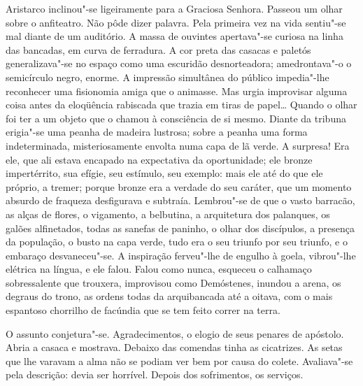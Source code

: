Aristarco inclinou"-se ligeiramente para a Graciosa Senhora.
Passeou um olhar sobre o anfiteatro. Não pôde dizer palavra. Pela
primeira vez na vida sentiu"-se mal diante de um auditório. A massa de
ouvintes apertava"-se curiosa na linha das bancadas, em curva de
ferradura. A cor preta das casacas e paletós generalizava"-se no
espaço como uma escuridão desnorteadora; amedrontava"-o o semicírculo
negro, enorme. A impressão simultânea do público impedia"-lhe
reconhecer uma fisionomia amiga que o animasse. Mas urgia improvisar
alguma coisa antes da eloqüência rabiscada que trazia em tiras de
papel\ldots{} Quando o olhar foi ter a um objeto que o chamou à consciência
de si mesmo. Diante da tribuna erigia"-se uma peanha de madeira
lustrosa; sobre a peanha uma forma indeterminada, misteriosamente
envolta numa capa de lã verde. A surpresa! Era ele, que ali estava
encapado na expectativa da oportunidade; ele bronze impertérrito, sua
efígie, seu estímulo, seu exemplo: mais ele até do que ele próprio, a
tremer; porque bronze era a verdade do seu caráter, que um momento
absurdo de fraqueza desfigurava e subtraía. Lembrou"-se de que o vasto
barracão, as alças de flores, o vigamento, a belbutina, a arquitetura
dos palanques, os galões alfinetados, todas as sanefas de paninho, o
olhar dos discípulos, a presença da população, o busto na capa verde,
tudo era o seu triunfo por seu triunfo, e o embaraço desvaneceu"-se. A
inspiração ferveu"-lhe de engulho à goela, vibrou"-lhe elétrica na
língua, e ele falou. Falou como nunca, esqueceu o calhamaço
sobressalente que trouxera, improvisou como Demóstenes, inundou a
arena, os degraus do trono, as ordens todas da arquibancada até a
oitava, com o mais espantoso chorrilho de facúndia que se tem feito
correr na terra. 

O assunto conjetura"-se. Agradecimentos, o elogio de
seus penares de apóstolo. Abria a casaca e mostrava. Debaixo das
comendas tinha as cicatrizes. As setas que lhe varavam a alma não se
podiam ver bem por causa do colete. Avaliava"-se pela descrição: devia
ser horrível. Depois dos sofrimentos, os serviços. 


